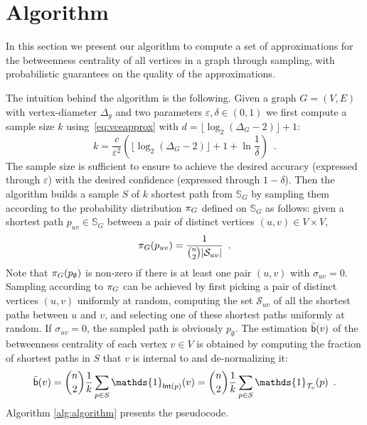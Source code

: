 \section{Algorithm}\label{sec:algo}
In this section we present our algorithm to compute a set of approximations for the
betweenness centrality of all vertices in a graph through sampling, with
probabilistic guarantees on the quality of the approximations.

The intuition behind the algorithm is the following. Given a graph $G=(V,E)$
with vertex-diameter $\Delta_g$ and two parameters $\varepsilon,\delta\in(0,1)$ we first compute a sample
size $k$ using~\eqref{eq:vceapprox} with
$d=\lfloor\log_2(\Delta_G-2)\rfloor+1$:
\begin{equation}\label{eq:samplesize}
k=\frac{c}{\varepsilon^2}\left(\lfloor\log_2(\Delta_G-2)\rfloor+1+\ln\frac{1}{\delta}\right)\enspace.
\end{equation}
The sample size is sufficient to ensure
to achieve the desired accuracy (expressed through $\varepsilon$) with the
desired confidence (expressed through $1-\delta$). Then the algorithm builds a
sample $S$ of $k$ shortest path from $\mathbb{S}_G$ by sampling them according to
the probability distribution $\pi_G$ defined on $\mathbb{S}_G$ as follows:
given a shortest path $p_{uv}\in\mathbb{S}_G$ between a pair of distinct vertices
$(u,v)\in V\times V$, 
\[
\prob_G(p_{uv})=\frac{1}{\binom{n}{2}|\mathcal{S}_{uv}|}\enspace.%
\]
Note that $\pi_G(p_\emptyset)$ is non-zero if there is at least one pair
$(u,v)$ with $\sigma_{uv}=0$.
Sampling according to $\pi_G$ can be achieved by first picking a pair of distinct vertices $(u,v)$
uniformly at random, computing the set $\mathcal{S}_{uv}$ of all the shortest
paths between $u$ and $v$, and selecting one of these shortest paths uniformly
at random. If $\sigma_{uv}=0$, the sampled path is obviously $p_\emptyset$. The
estimation $\tilde{\mathsf{b}}(v)$ of the betweenness centrality of each
vertex $v\in V$ is obtained by computing the fraction of shortest paths in $S$
that $v$ is internal to and de-normalizing it: 
\[
\tilde\betw(v) = \binom{n}{2}\frac{1}{k}\sum_{p\in S}
\mathds{1}_{\mathsf{Int}(p)}(v) = \binom{n}{2}\frac{1}{k}\sum_{p\in S}
\mathds{1}_{\mathcal{T}_v}(p)\enspace.
\]
Algorithm \ref{alg:algorithm} presents the pseudocode.
